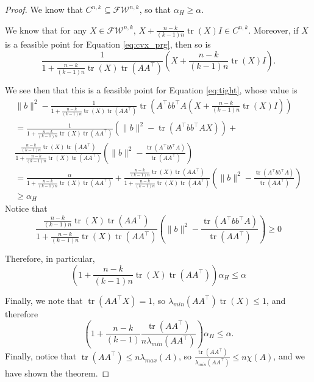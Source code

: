 \documentclass[a4paper]{article}
\newcommand{\FW}{\mathcal{F}\mathcal{W}}
\DeclareMathOperator*{\tr}{tr}
\begin{document}
\begin{proof}

We know that $C^{n,k} \subseteq \FW^{n,k}$, so that $\alpha_H \ge \alpha$.

We know that for any $X \in \FW^{n,k}$, $X + \frac{n-k}{(k-1)n}\tr(X)I \in C^{n,k}$. Moreover, if $X$ is a feasible point for Equation \ref{eq:cvx_prg}, then so is
\[
    \frac{1}{1+\frac{n-k}{(k-1)n}\tr(X)\tr(AA^{\intercal})}\left(X + \frac{n-k}{(k-1)n}\tr(X)I\right).
\]

We see then that this is a feasible point for Equation \ref{eq:tight}, whose value is 
\begin{align*}
    \|b\|^2 - \frac{1}{1+\frac{n-k}{(k-1)n}\tr(X)\tr(AA^{\intercal})}\tr\left(A^{\intercal}bb^{\intercal}A    \left(X + \frac{n-k}{(k-1)n}\tr(X)I\right)\right)\\
    = 
    \frac{1}{1+\frac{n-k}{(k-1)n}\tr(X)\tr(AA^{\intercal})}\left( \|b\|^2 - \tr\left(A^{\intercal}bb^{\intercal}A    X  \right)\right) + \\
        \frac{\frac{n-k}{(k-1)n}\tr(X)\tr(AA^{\intercal})}{1+\frac{n-k}{(k-1)n}\tr(X)\tr(AA^{\intercal})}\left( \|b\|^2 - \frac{\tr\left(A^{\intercal}bb^{\intercal}A\right)}{\tr(AA^{\intercal})}\right)\\
    = 
    \frac{\alpha}{1+\frac{n-k}{(k-1)n}\tr(X)\tr(AA^{\intercal})} + \frac{\frac{n-k}{(k-1)n}\tr(X)\tr(AA^{\intercal})}{1+\frac{n-k}{(k-1)n}\tr(X)\tr(AA^{\intercal})}\left( \|b\|^2 - \frac{\tr\left(A^{\intercal}bb^{\intercal}A\right)}{\tr(AA^{\intercal})}\right)\\
    \ge \alpha_H
\end{align*}
Notice that 
\[
    \frac{\frac{n-k}{(k-1)n}\tr(X)\tr(AA^{\intercal})}{1+\frac{n-k}{(k-1)n}\tr(X)\tr(AA^{\intercal})}\left( \|b\|^2 - \frac{\tr\left(A^{\intercal}bb^{\intercal}A\right)}{\tr(AA^{\intercal})}\right) \ge 0
\]

Therefore, in particular, 
\[
    (1+\frac{n-k}{(k-1)n}\tr(X)\tr(AA^{\intercal}))\alpha_H \le \alpha
\]

Finally, we note that $\tr(AA^{\intercal}X) = 1$, so $\lambda_{min}(AA^{\intercal})\tr(X) \le 1$, and therefore
\[
    (1+\frac{n-k}{(k-1)}\frac{\tr(AA^{\intercal})}{n\lambda_{min}(AA^{\intercal})})\alpha_H \le \alpha.
\]
Finally, notice that $\tr(AA^{\intercal}) \le n\lambda_{max}(A)$, so $\frac{\tr(AA^{\intercal})}{\lambda_{min}(AA^{\intercal})} \le n\chi(A)$, and we have shown the theorem.

\end{proof}
\end{document}
